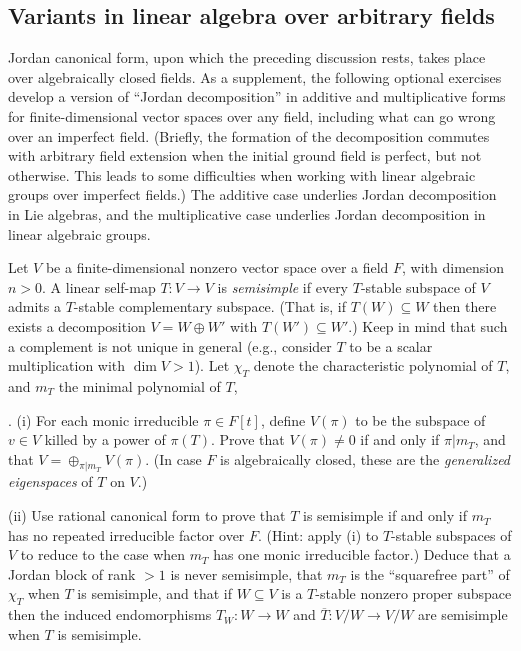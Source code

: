 \documentclass[10pt]{article}
\renewcommand{\(}{\left(}
\renewcommand{\)}{\right)}
\numberwithin{thm}{subsection}
\begin{document}
\subsection{Variants in linear algebra over arbitrary fields}

Jordan canonical form, upon which the preceding discussion rests, takes place over algebraically closed fields.
As a supplement, the following optional exercises develop a version of ``Jordan decomposition'' in additive and multiplicative forms for finite-dimensional vector spaces over any field, including what can go wrong over an imperfect field.  (Briefly, the formation of the decomposition commutes with arbitrary field extension when the initial ground field is perfect, but not otherwise.  This leads to some difficulties when working with linear algebraic groups over imperfect fields.)  The additive case underlies Jordan decomposition
in Lie algebras, and the multiplicative case underlies Jordan decomposition in linear algebraic groups.  

Let $V$ be a finite-dimensional nonzero vector space over a field $F$, with dimension $n > 0$.  A linear self-map $T:V \rightarrow V$ is {\em semisimple} if
every $T$-stable subspace of $V$ admits a $T$-stable complementary subspace.  (That is, if $T(W) \subseteq W$
then there exists a decomposition $V = W \oplus W'$ with $T(W') \subseteq W'$.) Keep in mind that such a complement
is not unique in general (e.g., consider $T$ to be a scalar multiplication with $\dim V > 1$).   
Let $\chi_T$ denote the characteristic polynomial of $T$, and $m_T$ the minimal polynomial of $T$,  

\medskip{}.  (i)  For each monic irreducible $\pi \in F[t]$, define $V(\pi)$ to be the subspace of $v \in V$ killed
by a power of $\pi(T)$.  Prove that $V(\pi) \ne 0$ if and only if $\pi|m_T$, and that $V = \oplus_{\pi|m_T} V(\pi)$.
(In case $F$ is algebraically closed, these are the {\em generalized eigenspaces} of $T$ on $V$.) 

(ii) Use rational canonical form to
prove that $T$ is semisimple if and only if $m_T$ has no repeated irreducible factor over $F$. 
(Hint: apply (i) to $T$-stable subspaces of $V$ to reduce to the case when $m_T$ has one monic irreducible factor.)
Deduce that a Jordan block of rank $> 1$ is never semisimple, that $m_T$ is the ``squarefree part'' of
$\chi_T$ when $T$ is semisimple, and that if $W \subseteq V$ is a $T$-stable nonzero proper subspace
then the induced endomorphisms $T_W:W \rightarrow W$ and
$\overline{T}:V/W \rightarrow V/W$ are semisimple when $T$ is semisimple.  
\end{document}
